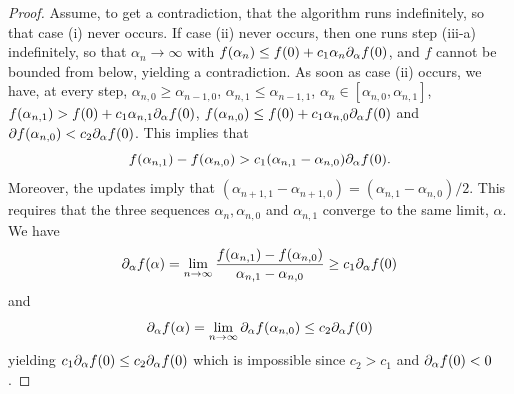 \begin{proof}
Assume, to get a contradiction, that the algorithm runs indefinitely, so that case (i) never occurs. If case (ii) never occurs, then one runs  step (iii-a) indefinitely, so that $\alpha_n \to \infty$ with $f(\alpha_n) \leq  f(0) + c_1\alpha_n \partial_\alpha f(0)$, and $f$ cannot be bounded from below, yielding a contradiction. As soon as case (ii) occurs, we have, at every step, $\alpha_{n,0} \geq \alpha_{n-1,0}$, $\alpha_{n,1} \leq \alpha_{n-1,1}$,
$\alpha_n \in [\alpha_{n,0}, \alpha_{n,1}]$, $f(\alpha_{n,1}) >  f(0) + c_1\alpha_{n,1} \partial_\alpha f(0)$, $f(\alpha_{n,0}) \leq  f(0) + c_1\alpha_{n,0} \partial_\alpha f(0)$ and $\partial f(\alpha_{n,0}) < c_2 \partial_\alpha f(0)$. This implies that
\[
f(\alpha_{n,1}) - f(\alpha_{n,0}) > c_1(\alpha_{n,1} - \alpha_{n,0}) \partial_\alpha f(0).
\]
Moreover, the updates imply that $(\alpha_{n+1,1} - \alpha_{n+1, 0}) = (\alpha_{n,1} - \alpha_{n,0})/2$. This requires that the three sequences $\alpha_n, \alpha_{n,0}$ and $\alpha_{n,1}$ converge to the same limit, $\alpha$. We have
\[
\partial_\alpha f(\alpha) = \lim_{n\to \infty}\frac{f(\alpha_{n,1}) - f(\alpha_{n,0})}{\alpha_{n,1} - \alpha_{n,0}} \geq c_1 \partial_\alpha f(0)
\]
and
\[
\partial_\alpha f(\alpha) = \lim_{n\to\infty} \partial_\alpha f(\alpha_{n,0}) \leq c_2 \partial_\alpha f(0)
\]
yielding $c_1 \partial_\alpha f(0) \leq c_2 \partial_\alpha f(0)$ which is impossible since $c_2>c_1$ and  $\partial_\alpha f(0)<0$.
\end{proof}

